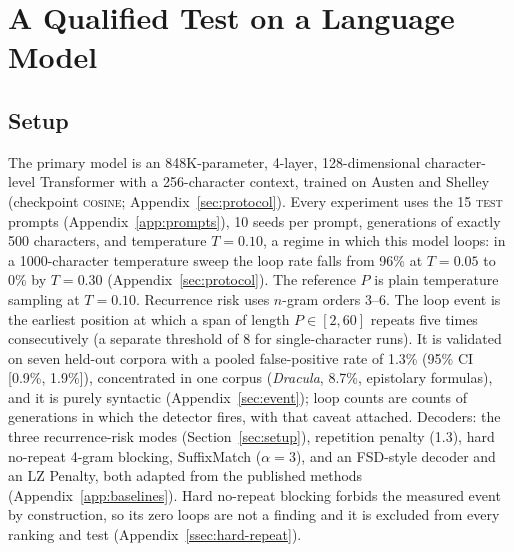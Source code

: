 \documentclass[make,article,submit,pdftex]{Definitions/mdpi}
\begin{document}
\section{A Qualified Test on a Language Model}\label{sec:real}

\subsection{Setup}
The primary model is an 848K-parameter, 4-layer, 128-dimensional character-level Transformer with a 256-character context, trained on Austen and Shelley (checkpoint \textsc{cosine}; Appendix~\ref{sec:protocol}). Every experiment uses the 15 \textsc{test} prompts (Appendix~\ref{app:prompts}), 10 seeds per prompt, generations of exactly 500 characters, and temperature $T=0.10$, a regime in which this model loops: in a 1000-character temperature sweep the loop rate falls from 96\% at $T=0.05$ to 0\% by $T=0.30$ (Appendix~\ref{sec:protocol}). The reference $P$ is plain temperature sampling at $T=0.10$. Recurrence risk uses $n$-gram orders 3--6. The loop event is the earliest position at which a span of length $P\in[2,60]$ repeats five times consecutively (a separate threshold of 8 for single-character runs). It is validated on seven held-out corpora with a pooled false-positive rate of 1.3\% (95\% CI [0.9\%, 1.9\%]), concentrated in one corpus (\emph{Dracula}, 8.7\%, epistolary formulas), and it is purely syntactic (Appendix~\ref{sec:event}); loop counts are counts of generations in which the detector fires, with that caveat attached. Decoders: the three recurrence-risk modes (Section~\ref{sec:setup}), repetition penalty (1.3), hard no-repeat 4-gram blocking, SuffixMatch ($\alpha=3$), and an FSD-style decoder and an LZ Penalty, both adapted from the published methods (Appendix~\ref{app:baselines}). Hard no-repeat blocking forbids the measured event by construction, so its zero loops are not a finding and it is excluded from every ranking and test (Appendix~\ref{ssec:hard-repeat}).
\end{document}
